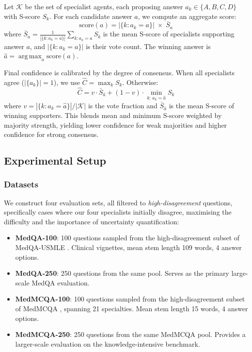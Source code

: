 \documentclass[10pt]{article}
\DeclareMathOperator*{\argmax}{arg\,max}
\begin{document}
Let $\mathcal{K}$ be the set of specialist agents, each proposing answer
$a_k \in \{A, B, C, D\}$ with S-score $S_k$.  For each candidate answer
$a$, we compute an aggregate score:
\begin{equation}
\text{score}(a) = |\{k : a_k = a\}| \;\times\; \bar{S}_a
\label{eq:fusion_score}
\end{equation}
where $\bar{S}_a = \frac{1}{|\{k:a_k=a\}|}\sum_{k:a_k=a} S_k$ is the mean
S-score of specialists supporting answer $a$, and $|\{k : a_k = a\}|$ is
their vote count.  The winning answer is $\hat{a} = \argmax_a \text{score}(a)$.

Final confidence is calibrated by the degree of consensus.  When all
specialists agree ($|\{a_k\}|=1$), we use $\hat{C} = \max_k S_k$.  Otherwise:
\begin{equation}
\hat{C} = v \cdot \bar{S}_{\hat{a}} + (1-v) \cdot \min_{k:\,a_k=\hat{a}} S_k
\label{eq:fusion_conf}
\end{equation}
where $v = |\{k : a_k = \hat{a}\}| / |\mathcal{K}|$ is the vote fraction and
$\bar{S}_{\hat{a}}$ is the mean S-score of winning supporters.  This blends
mean and minimum S-score weighted by majority strength, yielding lower
confidence for weak majorities and higher confidence for strong consensus.

\subsection{Experimental Setup}
\label{sec:setup}

\subsubsection{Datasets}

We construct four evaluation sets, all filtered to \emph{high-disagreement}
questions, specifically cases where our four specialists initially disagree, maximising
the difficulty and the importance of uncertainty quantification:

\begin{itemize}
    \item \textbf{MedQA-100}: 100 questions sampled from the high-disagreement
          subset of MedQA-USMLE \citep{jin2021disease}.  Clinical vignettes,
          mean stem length 109 words, 4 answer options.
    \item \textbf{MedQA-250}: 250 questions from the same pool.
          Serves as the primary large-scale MedQA evaluation.
    \item \textbf{MedMCQA-100}: 100 questions sampled from the high-disagreement
          subset of MedMCQA \citep{pal2022medmcqa}, spanning 21 specialties.
          Mean stem length 15 words, 4 answer options.
    \item \textbf{MedMCQA-250}: 250 questions from the same MedMCQA pool.
          Provides a larger-scale evaluation on the knowledge-intensive benchmark.
\end{itemize}
\end{document}
